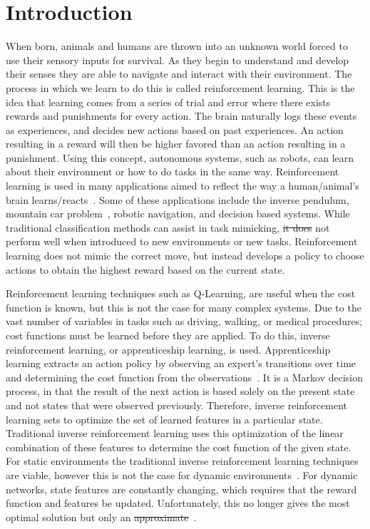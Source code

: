 \documentclass[12pt,american]{report}
\providecommand{\DIFaddtex}[1]{{\protect\color{blue}\uwave{#1}}} %
\providecommand{\DIFdeltex}[1]{{\protect\color{red}\sout{#1}}}                      %
\providecommand{\DIFaddbegin}{} %
\providecommand{\DIFaddend}{} %
\providecommand{\DIFdelbegin}{} %
\providecommand{\DIFdelend}{} %
\providecommand{\DIFadd}[1]{\texorpdfstring{\DIFaddtex{#1}}{#1}} %
\providecommand{\DIFdel}[1]{\texorpdfstring{\DIFdeltex{#1}}{}} %
\newcommand{\DIFscaledelfig}{0.5}
\newlength{\DIFdelgraphicswidth} %
\newlength{\DIFdelgraphicsheight} %
\newcommand{\DIFaddincludegraphics}[2][]{{\color{blue}\fbox{\DIFOincludegraphics[#1]{#2}}}} %
\newcommand{\DIFdelincludegraphics}[2][]{%
\sbox{\DIFdelgraphicsbox}{\DIFOincludegraphics[#1]{#2}}%
\settoboxwidth{\DIFdelgraphicswidth}{\DIFdelgraphicsbox} %
\settoboxtotalheight{\DIFdelgraphicsheight}{\DIFdelgraphicsbox} %
\scalebox{\DIFscaledelfig}{%
\parbox[b]{\DIFdelgraphicswidth}{\usebox{\DIFdelgraphicsbox}\\[-\baselineskip] \rule{\DIFdelgraphicswidth}{0em}}\llap{\resizebox{\DIFdelgraphicswidth}{\DIFdelgraphicsheight}{%
\setlength{\unitlength}{\DIFdelgraphicswidth}%
\begin{picture}(1,1)%
\thicklines\linethickness{2pt} %
{\color[rgb]{1,0,0}\put(0,0){\framebox(1,1){}}}%
{\color[rgb]{1,0,0}\put(0,0){\line( 1,1){1}}}%
{\color[rgb]{1,0,0}\put(0,1){\line(1,-1){1}}}%
\end{picture}%
}\hspace*{3pt}}} %
} %
\DeclareRobustCommand{\DIFaddbegin}{\DIFOaddbegin \let\includegraphics\DIFaddincludegraphics} %
\DeclareRobustCommand{\DIFaddend}{\DIFOaddend \let\includegraphics\DIFOincludegraphics} %
\DeclareRobustCommand{\DIFdelbegin}{\DIFOdelbegin \let\includegraphics\DIFdelincludegraphics} %
\DeclareRobustCommand{\DIFdelend}{\DIFOaddend \let\includegraphics\DIFOincludegraphics} %
\begin{document}
\chapter{Introduction}
\label{sec:introduction}
When born, animals and humans are thrown into an unknown world forced to use their sensory inputs for survival. As they begin to understand and develop their senses they are able to  navigate  and  interact  with  their  environment.  The  process  in which  we  learn  to  do  this  is  called  reinforcement  learning.  This is  the  idea  that  learning  comes  from  a  series  of  trial  and  error where  there  exists  rewards  and  punishments  for  every  action. The brain naturally logs these events as experiences, and decides new  actions  based  on  past  experiences. An  action  resulting  in  a reward  will  then  be  higher  favored  than  an  action  resulting  in a  punishment.  Using  this  concept,  autonomous  systems,  such  as robots, can learn about their environment or how to do tasks in the same way. Reinforcement learning is used in many applications aimed to reflect the way a human/animal's brain learns/reacts~\cite{atari}.  Some of these applications include the inverse pendulum, mountain car problem~\cite{sutton1996generalization}, robotic navigation, and decision based systems.  While traditional classification methods can assist in task mimicking, \DIFdelbegin \DIFdel{it does }\DIFdelend \DIFaddbegin \DIFadd{they do }\DIFaddend not perform well when introduced to new environments or new tasks.  Reinforcement learning does not mimic the correct move, but instead develops a policy to choose actions to obtain the highest reward based on the current state.

Reinforcement learning techniques such as Q-Learning, are useful when the cost function is known, but this is not the case for many complex systems. Due to the vast number of variables in tasks such as driving, walking, or medical procedures; cost functions must be learned before they are applied.  To do this, inverse reinforcement learning, or apprenticeship learning, is used. Apprenticeship learning extracts an action policy by observing an expert's transitions over time and determining the cost function from the observations~\cite{ngoinverse}. It is a Markov decision process, in that the result of the next action is based solely on the present state and not states that were observed previously. Therefore, inverse reinforcement learning sets to optimize the set of learned features in a particular state. Traditional inverse reinforcement learning uses this optimization of the linear combination of these features to determine the cost function of the given state. For static environments the traditional inverse reinforcement learning techniques are viable, however this is not the case for dynamic environments~\cite{vasquez2014inverse}. For dynamic networks, state features are constantly changing, which requires that the reward function and features be updated.   Unfortunately, this no longer gives the most optimal solution but only an \DIFdelbegin \DIFdel{approximate}\DIFdelend \DIFaddbegin \DIFadd{approximation}\DIFaddend ~\cite{vasquez2014inverse}. 
\end{document}
